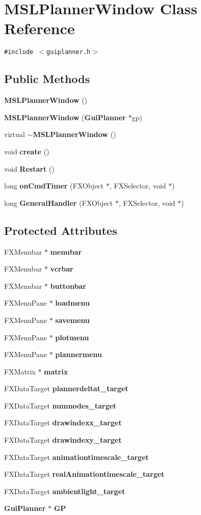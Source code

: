 \section{MSLPlanner\-Window  Class Reference}
\label{classMSLPlannerWindow}
{\tt \#include $<$guiplanner.h$>$}

\subsection*{Public Methods}
\begin{CompactItemize}
\item 
{\bf MSLPlanner\-Window} ()
\item 
{\bf MSLPlanner\-Window} ({\bf Gui\-Planner} $\ast$gp)
\item 
virtual {\bf $\sim$MSLPlanner\-Window} ()
\item 
void {\bf create} ()
\item 
void {\bf Restart} ()
\item 
long {\bf on\-Cmd\-Timer} (FXObject $\ast$, FXSelector, void $\ast$)
\item 
long {\bf General\-Handler} (FXObject $\ast$, FXSelector, void $\ast$)
\end{CompactItemize}
\subsection*{Protected Attributes}
\begin{CompactItemize}
\item 
FXMenubar $\ast$ {\bf menubar}
\item 
FXMenubar $\ast$ {\bf vcrbar}
\item 
FXMenubar $\ast$ {\bf buttonbar}
\item 
FXMenu\-Pane $\ast$ {\bf loadmenu}
\item 
FXMenu\-Pane $\ast$ {\bf savemenu}
\item 
FXMenu\-Pane $\ast$ {\bf plotmenu}
\item 
FXMenu\-Pane $\ast$ {\bf plannermenu}
\item 
FXMatrix $\ast$ {\bf matrix}
\item 
FXData\-Target {\bf plannerdeltat\_\-target}
\item 
FXData\-Target {\bf numnodes\_\-target}
\item 
FXData\-Target {\bf drawindexx\_\-target}
\item 
FXData\-Target {\bf drawindexy\_\-target}
\item 
FXData\-Target {\bf animationtimescale\_\-target}
\item 
FXData\-Target {\bf real\-Animationtimescale\_\-target}
\item 
FXData\-Target {\bf ambientlight\_\-target}
\item 
{\bf Gui\-Planner} $\ast$ {\bf GP}
\end{CompactItemize}
